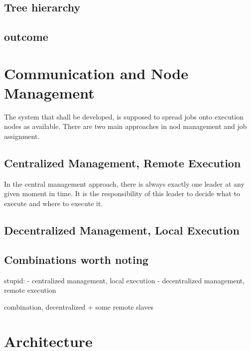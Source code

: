 \subsection{Tree hierarchy}

\subsection{outcome}




\section{Communication and Node Management}

The system that shall be developed, is supposed to spread jobs onto execution nodes as available.
There are two main approaches in nod management and job assignment.



\subsection{Centralized Management, Remote Execution}

In the central management approach, there is always exactly one leader at any given moment in time.
It is the responsibility of this leader to decide what to execute and where to execute it.

\subsection{Decentralized Management, Local Execution}

\subsection{Combinations worth noting}

stupid:
 - centralized management, local execution
 - decentralized management, remote execution
 
combination, decentralized + some remote slaves

\section{Architecture}



